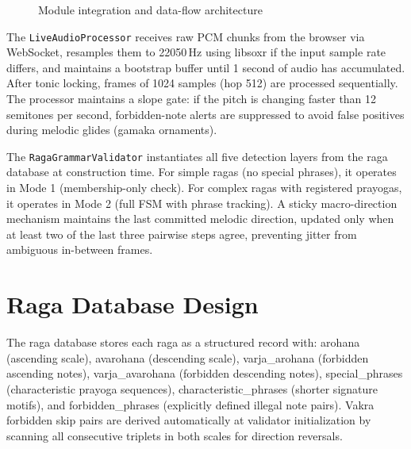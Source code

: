 \documentclass[12pt,a4paper]{report}
\numberwithin{equation}{chapter}
\begin{document}
\begin{figure}[htbp]
{%
}
\caption{Module integration and data-flow architecture}
\label{fig:integration}
\end{figure}

The \texttt{LiveAudioProcessor} receives raw PCM chunks from the browser via WebSocket, resamples them to 22050\,Hz using libsoxr if the input sample rate differs, and maintains a bootstrap buffer until 1 second of audio has accumulated. After tonic locking, frames of 1024 samples (hop 512) are processed sequentially. The processor maintains a slope gate: if the pitch is changing faster than 12 semitones per second, forbidden-note alerts are suppressed to avoid false positives during melodic glides (gamaka ornaments).

The \texttt{RagaGrammarValidator} instantiates all five detection layers from the raga database at construction time. For simple ragas (no special phrases), it operates in Mode 1 (membership-only check). For complex ragas with registered prayogas, it operates in Mode 2 (full FSM with phrase tracking). A sticky macro-direction mechanism maintains the last committed melodic direction, updated only when at least two of the last three pairwise steps agree, preventing jitter from ambiguous in-between frames.

\section{Raga Database Design}
The raga database stores each raga as a structured record with: arohana (ascending scale), avarohana (descending scale), varja\_arohana (forbidden ascending notes), varja\_avarohana (forbidden descending notes), special\_phrases (characteristic prayoga sequences), characteristic\_phrases (shorter signature motifs), and forbidden\_phrases (explicitly defined illegal note pairs). Vakra forbidden skip pairs are derived automatically at validator initialization by scanning all consecutive triplets in both scales for direction reversals.
\end{document}
